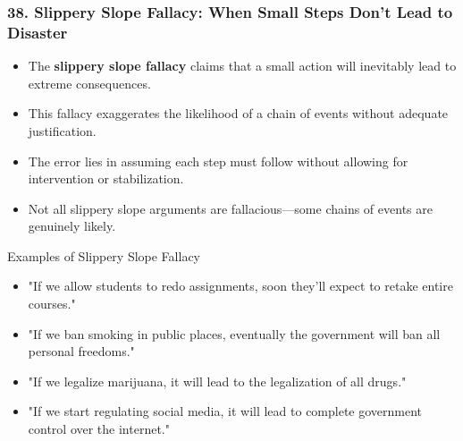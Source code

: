 \documentclass{beamer}
\begin{document}
    \begin{frame}
    \frametitle{38. Slippery Slope Fallacy: When Small Steps Don't Lead to Disaster}
    \begin{itemize}
        \item The \textbf{slippery slope fallacy} claims that a small action will inevitably lead to extreme consequences.
        \item This fallacy exaggerates the likelihood of a chain of events without adequate justification.
        \item The error lies in assuming each step must follow without allowing for intervention or stabilization.
        \item Not all slippery slope arguments are fallacious—some chains of events are genuinely likely.
    \end{itemize}

    \begin{alertblock}{Examples of Slippery Slope Fallacy}
        \scriptsize
    \begin{itemize}
        \item "If we allow students to redo assignments, soon they'll expect to retake entire courses."
        \item "If we ban smoking in public places, eventually the government will ban all personal freedoms."
        \item "If we legalize marijuana, it will lead to the legalization of all drugs."
        \item "If we start regulating social media, it will lead to complete government control over the internet."
    \end{itemize}
    \end{alertblock}
    
\end{frame}
    
\end{document}
